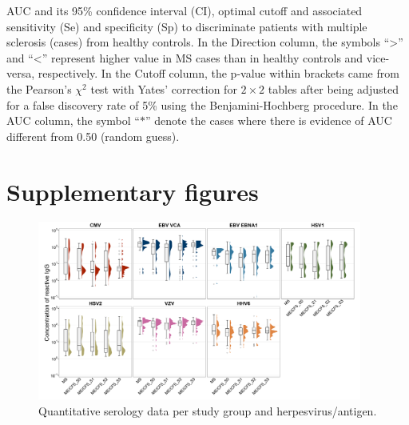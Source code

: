 \begin{table}[h]
    \centering
    \caption[AUC and its 95\% confidence interval, optimal cutoff and associated sensitivity and specificity to discriminate patients with multiple sclerosis from healthy controls]{AUC and its 95\% confidence interval (CI), optimal cutoff and associated sensitivity (Se) and specificity (Sp) to discriminate patients with multiple sclerosis (cases) from healthy controls. In the Direction column, the symbols ``{>}'' and ``{<}'' represent higher value in MS cases than in healthy controls and vice-versa, respectively. In the Cutoff column, the p-value within brackets came from the Pearson’s $\chi^2$ test with Yates' correction for $2 \times 2$ tables after being adjusted for a false discovery rate of 5\% using the Benjamini-Hochberg procedure. In the AUC column, the symbol ``{$\ast$}'' denote the cases where there is evidence of AUC different from 0.50 (random guess).}
    \resizebox{\linewidth}{!}{}
    \label{appendix:taba3-models-auc-optimal-cutoff-ms}
\end{table}

\clearpage
\section{Supplementary figures}


\begin{figure}[h]
    \centering
    \includegraphics[width=0.95\textwidth]{chapter/2023-sym-and-herpesvirus/figures/figa1-quantitative-serology.png}
    \caption[Quantitative serology data per study group and herpesvirus/antigen]{Quantitative serology data per study group and herpesvirus/antigen.}
    \label{appendix:figa1-quantitative-serology}
\end{figure}


